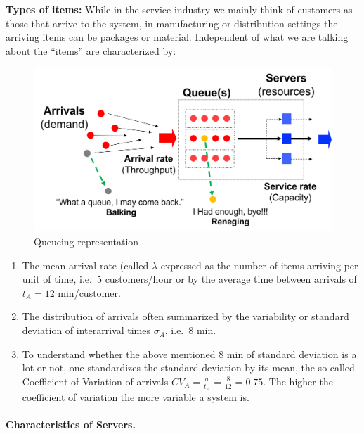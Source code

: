 \documentclass[
  letterpaper,
  DIV=11,
  numbers=noendperiod]{scrartcl}
\makeatletter
\let\oldparagraph\paragraph
\renewcommand{\paragraph}{
    \@ifstar
      \xxxParagraphStar
      \xxxParagraphNoStar
  }
\newcommand{\xxxParagraphStar}[1]{\oldparagraph*{#1}\mbox{}}
\newcommand{\xxxParagraphNoStar}[1]{\oldparagraph{#1}\mbox{}}
\providecommand{\tightlist}{%
  \setlength{\itemsep}{0pt}\setlength{\parskip}{0pt}}
\makeatother
\begin{document}
\textbf{Types of items:} While in the service industry we mainly think
of customers as those that arrive to the system, in manufacturing or
distribution settings the arriving items can be packages or material.
Independent of what we are talking about the ``items'' are characterized
by:

\begin{figure}[H]

{\centering \includegraphics[width=0.5\linewidth,height=\textheight,keepaspectratio]{queueing_representation.png}

}

\caption{Queueing representation}

\end{figure}%

\begin{enumerate}
\def\labelenumi{\alph{enumi})}
\tightlist
\item
  The mean arrival rate (called \(\lambda\) expressed as the number of
  items arriving per unit of time, i.e.~5 customers/hour or by the
  average time between arrivals of \(t_A=12\) min/customer.
\item
  The distribution of arrivals often summarized by the variability or
  standard deviation of interarrival times \(\sigma_A\), i.e.~8 min.
\item
  To understand whether the above mentioned 8 min of standard deviation
  is a lot or not, one standardizes the standard deviation by its mean,
  the so called Coefficient of Variation of arrivals
  \(CV_A=\frac{\sigma}{t_A}=\frac{8}{12}=0.75\). The higher the
  coefficient of variation the more variable a system is.
\end{enumerate}

\paragraph{\texorpdfstring{\textbf{Characteristics of
Servers.}}{Characteristics of Servers.}}\label{characteristics-of-servers.}
\end{document}

